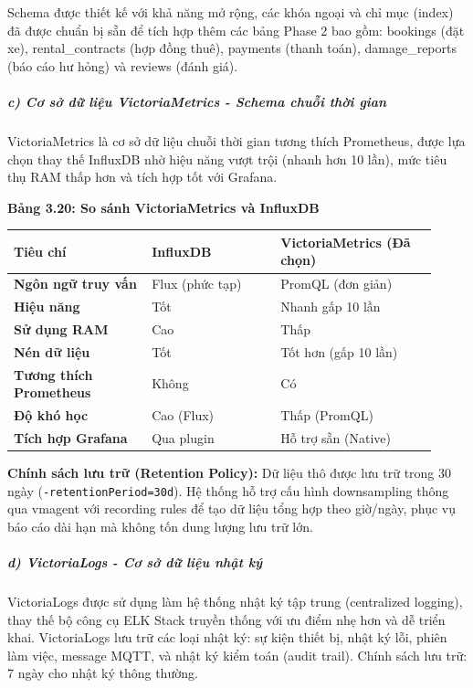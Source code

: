 \documentclass[13pt,a4paper]{extarticle}
\newcounter{none} %
\newcommand{\thesislongtableorignewline}{}
\let\thesislongtableorignewline\\
\renewcommand{\\}{\thesislongtableorignewline\hline}%
\let\\\thesislongtableorignewline
\newcommand{\thesistabletitle}[1]{%
  \begin{center}\textbf{#1}\end{center}%
}
\begin{document}
Schema được thiết kế với khả năng mở rộng, các khóa ngoại và chỉ mục
(index) đã được chuẩn bị sẵn để tích hợp thêm các bảng Phase 2 bao gồm:
bookings (đặt xe), rental\_contracts (hợp đồng thuê), payments (thanh
toán), damage\_reports (báo cáo hư hỏng) và reviews (đánh giá).

\subparagraph{c) Cơ sở dữ liệu VictoriaMetrics - Schema chuỗi thời
gian}\label{c-cux1a1-sux1edf-dux1eef-liux1ec7u-victoriametrics---schema-chuux1ed7i-thux1eddi-gian}

VictoriaMetrics là cơ sở dữ liệu chuỗi thời gian tương thích Prometheus,
được lựa chọn thay thế InfluxDB nhờ hiệu năng vượt trội (nhanh hơn 10
lần), mức tiêu thụ RAM thấp hơn và tích hợp tốt với Grafana.

\thesistabletitle{Bảng 3.20: So sánh VictoriaMetrics và InfluxDB}

{\def\LTcaptype{none} %
\begin{longtable}{|p{0.30\linewidth}|p{0.28\linewidth}|p{0.34\linewidth}|}
\hline \textbf{Tiêu chí} & \textbf{InfluxDB} & \textbf{VictoriaMetrics (Đã chọn)} \\
\hline
\endhead
\hline
\endlastfoot
\textbf{Ngôn ngữ truy vấn} & Flux (phức tạp) & PromQL (đơn giản) \\
\textbf{Hiệu năng} & Tốt & Nhanh gấp 10 lần \\
\textbf{Sử dụng RAM} & Cao & Thấp \\
\textbf{Nén dữ liệu} & Tốt & Tốt hơn (gấp 10 lần) \\
\textbf{Tương thích Prometheus} & Không & Có \\
\textbf{Độ khó học} & Cao (Flux) & Thấp (PromQL) \\
\textbf{Tích hợp Grafana} & Qua plugin & Hỗ trợ sẵn (Native) \\
\end{longtable}
}

\textbf{Chính sách lưu trữ (Retention Policy):} Dữ liệu thô được lưu trữ
trong 30 ngày (\texttt{-retentionPeriod=30d}). Hệ thống hỗ trợ cấu hình
downsampling thông qua vmagent với recording rules để tạo dữ liệu tổng
hợp theo giờ/ngày, phục vụ báo cáo dài hạn mà không tốn dung lượng lưu
trữ lớn.

\subparagraph{d) VictoriaLogs - Cơ sở dữ liệu nhật
ký}\label{d-victorialogs---cux1a1-sux1edf-dux1eef-liux1ec7u-nhux1eadt-kuxfd}

VictoriaLogs được sử dụng làm hệ thống nhật ký tập trung (centralized
logging), thay thế bộ công cụ ELK Stack truyền thống với ưu điểm nhẹ hơn
và dễ triển khai. VictoriaLogs lưu trữ các loại nhật ký: sự kiện thiết
bị, nhật ký lỗi, phiên làm việc, message MQTT, và nhật ký kiểm toán
(audit trail). Chính sách lưu trữ: 7 ngày cho nhật ký thông thường.
\end{document}

